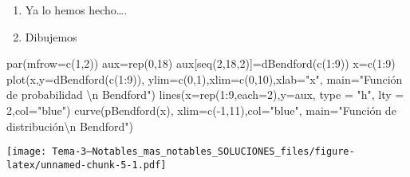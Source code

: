 \documentclass[
]{article}
\newenvironment{Shaded}{\begin{snugshade}}{\end{snugshade}}
\newcommand{\AttributeTok}[1]{\textcolor[rgb]{0.77,0.63,0.00}{#1}}
\newcommand{\DecValTok}[1]{\textcolor[rgb]{0.00,0.00,0.81}{#1}}
\newcommand{\FunctionTok}[1]{\textcolor[rgb]{0.00,0.00,0.00}{#1}}
\newcommand{\NormalTok}[1]{#1}
\newcommand{\OtherTok}[1]{\textcolor[rgb]{0.56,0.35,0.01}{#1}}
\newcommand{\SpecialCharTok}[1]{\textcolor[rgb]{0.00,0.00,0.00}{#1}}
\newcommand{\StringTok}[1]{\textcolor[rgb]{0.31,0.60,0.02}{#1}}
\begin{document}
\begin{enumerate}
\def\labelenumi{\alph{enumi})}
\setcounter{enumi}{3}
\item
  Ya lo hemos hecho\ldots.
\item
  Dibujemos
\end{enumerate}

\begin{Shaded}
\begin{Highlighting}[]
\FunctionTok{par}\NormalTok{(}\AttributeTok{mfrow=}\FunctionTok{c}\NormalTok{(}\DecValTok{1}\NormalTok{,}\DecValTok{2}\NormalTok{))}
\NormalTok{aux}\OtherTok{=}\FunctionTok{rep}\NormalTok{(}\DecValTok{0}\NormalTok{,}\DecValTok{18}\NormalTok{)}
\NormalTok{aux[}\FunctionTok{seq}\NormalTok{(}\DecValTok{2}\NormalTok{,}\DecValTok{18}\NormalTok{,}\DecValTok{2}\NormalTok{)]}\OtherTok{=}\FunctionTok{dBendford}\NormalTok{(}\FunctionTok{c}\NormalTok{(}\DecValTok{1}\SpecialCharTok{:}\DecValTok{9}\NormalTok{))}
\NormalTok{x}\OtherTok{=}\FunctionTok{c}\NormalTok{(}\DecValTok{1}\SpecialCharTok{:}\DecValTok{9}\NormalTok{)}
\FunctionTok{plot}\NormalTok{(x,}\AttributeTok{y=}\FunctionTok{dBendford}\NormalTok{(}\FunctionTok{c}\NormalTok{(}\DecValTok{1}\SpecialCharTok{:}\DecValTok{9}\NormalTok{)),}
  \AttributeTok{ylim=}\FunctionTok{c}\NormalTok{(}\DecValTok{0}\NormalTok{,}\DecValTok{1}\NormalTok{),}\AttributeTok{xlim=}\FunctionTok{c}\NormalTok{(}\DecValTok{0}\NormalTok{,}\DecValTok{10}\NormalTok{),}\AttributeTok{xlab=}\StringTok{"x"}\NormalTok{,}
  \AttributeTok{main=}\StringTok{"Función de probabilidad }\SpecialCharTok{\textbackslash{}n}\StringTok{ Bendford"}\NormalTok{)}
\FunctionTok{lines}\NormalTok{(}\AttributeTok{x=}\FunctionTok{rep}\NormalTok{(}\DecValTok{1}\SpecialCharTok{:}\DecValTok{9}\NormalTok{,}\AttributeTok{each=}\DecValTok{2}\NormalTok{),}\AttributeTok{y=}\NormalTok{aux, }\AttributeTok{type =} \StringTok{"h"}\NormalTok{, }\AttributeTok{lty =} \DecValTok{2}\NormalTok{,}\AttributeTok{col=}\StringTok{"blue"}\NormalTok{)}
\FunctionTok{curve}\NormalTok{(}\FunctionTok{pBendford}\NormalTok{(x), }\AttributeTok{xlim=}\FunctionTok{c}\NormalTok{(}\SpecialCharTok{{-}}\DecValTok{1}\NormalTok{,}\DecValTok{11}\NormalTok{),}\AttributeTok{col=}\StringTok{"blue"}\NormalTok{, }\AttributeTok{main=}\StringTok{"Función de distribución}\SpecialCharTok{\textbackslash{}n}\StringTok{ Bendford"}\NormalTok{)}
\end{Highlighting}
\end{Shaded}

\texttt{[image: Tema-3---Notables\_mas\_notables\_SOLUCIONES\_files/figure-latex/unnamed-chunk-5-1.pdf]}
\end{document}
